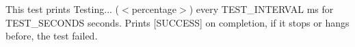 This test prints {\ttfamily Testing... ($<$percentage$>$)} every {\ttfamily T\+E\+S\+T\+\_\+\+I\+N\+T\+E\+R\+V\+AL} ms for {\ttfamily T\+E\+S\+T\+\_\+\+S\+E\+C\+O\+N\+DS} seconds. Prints {\ttfamily \mbox{[}S\+U\+C\+C\+E\+SS\mbox{]}} on completion, if it stops or hangs before, the test failed. 